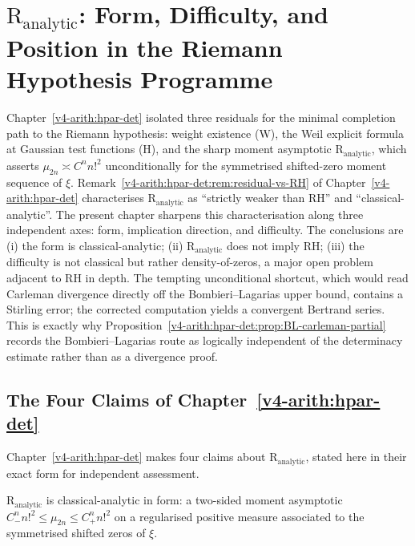 \chapter{\(\mathrm{R}_{\mathrm{analytic}}\): Form, Difficulty, and Position in the Riemann Hypothesis Programme}
\label{v4-arith:R-analytic-audit}

Chapter~\ref{v4-arith:hpar-det} isolated three residuals for the
minimal completion path to the Riemann hypothesis: weight existence
(W), the Weil explicit formula at Gaussian test functions (H), and
the sharp moment asymptotic \(\mathrm{R}_{\mathrm{analytic}}\),
which asserts \(\mu_{2n}\asymp C^{n}n!^{2}\) unconditionally for the
symmetrised shifted-zero moment sequence of \(\xi\).
Remark~\ref{v4-arith:hpar-det:rem:residual-vs-RH} of
Chapter~\ref{v4-arith:hpar-det} characterises
\(\mathrm{R}_{\mathrm{analytic}}\) as ``strictly weaker than RH'' and
``classical-analytic''. The present chapter sharpens this
characterisation along three independent axes: form, implication
direction, and difficulty. The conclusions are (i) the form is
classical-analytic; (ii) \(\mathrm{R}_{\mathrm{analytic}}\) does not
imply RH; (iii) the difficulty is not classical but rather
density-of-zeros, a major open problem adjacent to RH in depth.
The tempting unconditional shortcut, which would read Carleman
divergence directly off the Bombieri--Lagarias upper bound, contains a
Stirling error; the corrected computation yields a convergent Bertrand
series. This is exactly why
Proposition~\ref{v4-arith:hpar-det:prop:BL-carleman-partial}
records the Bombieri--Lagarias route as logically independent of the
determinacy estimate rather than as a divergence proof.

\section{The Four Claims of Chapter~\ref{v4-arith:hpar-det}}
\label{v4-arith:r-audit:statement}

Chapter~\ref{v4-arith:hpar-det} makes four claims about
\(\mathrm{R}_{\mathrm{analytic}}\), stated here in their exact form
for independent assessment.

\begin{claimnaive}
\label{v4-arith:r-audit:claim-1}
\(\mathrm{R}_{\mathrm{analytic}}\) is classical-analytic in form:
a two-sided moment asymptotic
\(C_{-}^{n}n!^{2}\le \mu_{2n}\le C_{+}^{n}n!^{2}\) on a regularised
positive measure associated to the symmetrised shifted zeros of
\(\xi\).
\end{claimnaive}

